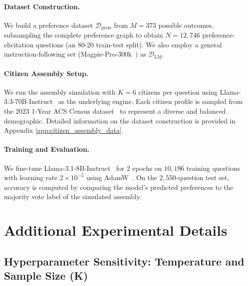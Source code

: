 \paragraph{Dataset Construction.}
We build a preference dataset $\mathcal{D}_\text{prefs}$ from \(M = 373\) possible outcomes, subsampling the complete preference graph to obtain \(N = 12,\!746\) preference-elicitation questions (an 80-20 train-test split). We also employ a general instruction-following set (Magpie-Pro-300k~\citep{xu2024magpiealignmentdatasynthesis}) as $\mathcal{D}_\text{LM}$.

\paragraph{Citizen Assembly Setup.}
We run the assembly simulation with $K = 6$ citizens per question using Llama-3.3-70B-Instruct~\citep{llama3modelcard} as the underlying engine. Each citizen profile is sampled from the 2023 1-Year ACS Census dataset~\citep{us_census_2023} to represent a diverse and balanced demographic. Detailed information on the dataset construction is provided in Appendix \ref{app:citizen_assembly_data}.

\paragraph{Training and Evaluation.}
We fine-tune Llama-3.1-8B-Instruct~\citep{llama3modelcard} for 2 epochs on $10,\!196$ training questions with learning rate $2 \times 10^{-5}$ using AdamW~\citep{loshchilov2019decoupledweightdecayregularization}. On the $2,\!550$-question test set, accuracy is computed by comparing the model’s predicted preferences to the majority vote label of the simulated assembly.














\section{Additional Experimental Details}
\subsection{Hyperparameter Sensitivity: Temperature and Sample Size (K)}

